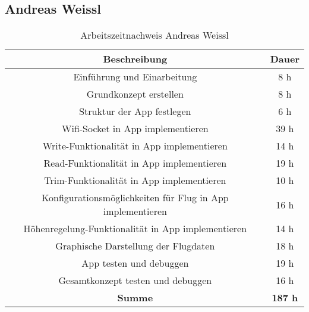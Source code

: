 \subsection{Andreas Weissl}

\begin{table}[h!]
\centering
\begin{tabular}{|c|c|}
\hline
\multicolumn{1}{|c|}{\textbf{Beschreibung}}  &
\multicolumn{1}{c|}{\textbf{Dauer}}  \\ \hline
  Einführung und Einarbeitung & 8 h \\ \hline
  Grundkonzept erstellen & 8 h \\ \hline
  Struktur der App festlegen & 6 h \\ \hline
  Wifi-Socket in App implementieren & 39 h \\ \hline
  Write-Funktionalität in App implementieren & 14 h \\ \hline
  Read-Funktionalität in App implementieren & 19 h \\ \hline
  Trim-Funktionalität in App implementieren & 10 h \\ \hline
  Konfigurationsmöglichkeiten für Flug in App implementieren & 16 h \\ \hline
  Höhenregelung-Funktionalität in App implementieren & 14 h \\ \hline
  Graphische Darstellung der Flugdaten & 18 h \\ \hline
  App testen und debuggen & 19 h \\ \hline
  Gesamtkonzept testen und debuggen & 16 h \\ \hline
  {\textbf{Summe}} & \textbf{187 h} \\ \hline
 \end{tabular}
\caption{Arbeitszeitnachweis Andreas Weissl}
\end{table}

\newpage





